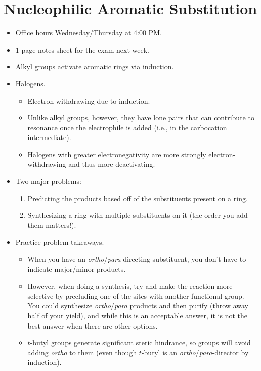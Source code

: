 \documentclass[../notes.tex]{subfiles}
\begin{document}
\section{Nucleophilic Aromatic Substitution}
\begin{itemize}
    \item {}Office hours Wednesday/Thursday at 4:00 PM.
    \item 1 page notes sheet for the exam next week.
    \item Alkyl groups activate aromatic rings via induction.
    \item Halogens.
    \begin{itemize}
        \item Electron-withdrawing due to induction.
        \item Unlike alkyl groups, however, they have lone pairs that can contribute to resonance once the electrophile is added (i.e., in the carbocation intermediate).
        \item Halogens with greater electronegativity are more strongly electron-withdrawing and thus more deactivating.
    \end{itemize}
    \item Two major problems:
    \begin{enumerate}
        \item Predicting the products based off of the substituents present on a ring.
        \item Synthesizing a ring with multiple substituents on it (the order you add them matters!).
    \end{enumerate}
    \item Practice problem takeaways.
    \begin{itemize}
        \item When you have an \emph{ortho}/\emph{para}-directing substituent, you don't have to indicate major/minor products.
        \item However, when doing a synthesis, try and make the reaction more selective by precluding one of the sites with another functional group. You could synthesize \emph{ortho}/\emph{para} products and then purify (throw away half of your yield), and while this is an acceptable answer, it is not the best answer when there are other options.
        \item $t$-butyl groups generate significant steric hindrance, so groups will avoid adding \emph{ortho} to them (even though $t$-butyl is an \emph{ortho}/\emph{para}-director by induction).

\end{itemize}
\end{itemize}
\end{document}
